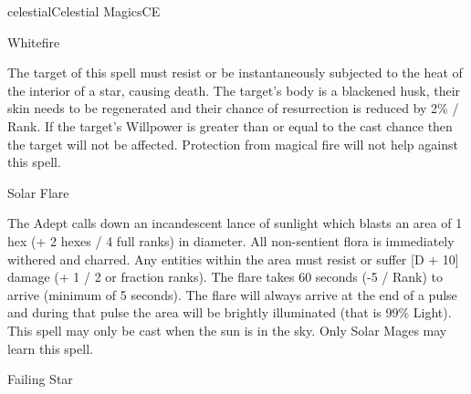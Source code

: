 \begin{college}[1.3]{celestial}{Celestial Magics}{CE}
\begin{spell}[S-9]{Whitefire}
\begin{effects}
The target of this spell must resist or be instantaneously subjected
to the heat of the interior of a star, causing death.  The target's
body is a blackened husk, their skin needs to be regenerated and their
chance of resurrection is reduced by 2\% / Rank.  If the target's
Willpower is greater than or equal to the cast chance then the target
will not be affected.  Protection from magical fire will not help
against this spell.
\end{effects}
\end{spell}

\begin{spell}[S-10 Solar]{Solar Flare}
\begin{effects}
The Adept calls down an incandescent lance of sunlight which blasts an
area of 1 hex (+ 2 hexes / 4 full ranks) in diameter.  All
non-sentient flora is immediately withered and charred.  Any entities
within the area must resist or suffer [D + 10] damage (+ 1 / 2 or
fraction ranks).  The flare takes 60 seconds (-5 / Rank) to arrive
(minimum of 5 seconds).  The flare will always arrive at the end of a
pulse and during that pulse the area will be brightly illuminated
(that is 99\% Light).  This spell may only be cast when the sun is in
the sky.  Only Solar Mages may learn this spell.
\end{effects}
\end{spell}

\begin{spell}[S-10 Star]{Failing Star}


\end{spell}
\end{college}
